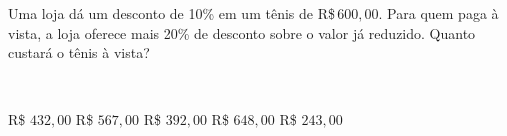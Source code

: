 \parbox{\linewidth}{

Uma loja dá um desconto de 10\% em um tênis de R\$\,$600{,}00$. Para quem paga à vista, a loja oferece mais 20\% de desconto sobre o valor já reduzido. Quanto custará o tênis à vista?}
\vspace{2mm}
\\\parbox{\linewidth}{

R\$ $432{,}00$
R\$ $567{,}00$
R\$ $392{,}00$
R\$ $648{,}00$
R\$ $243{,}00$

}


